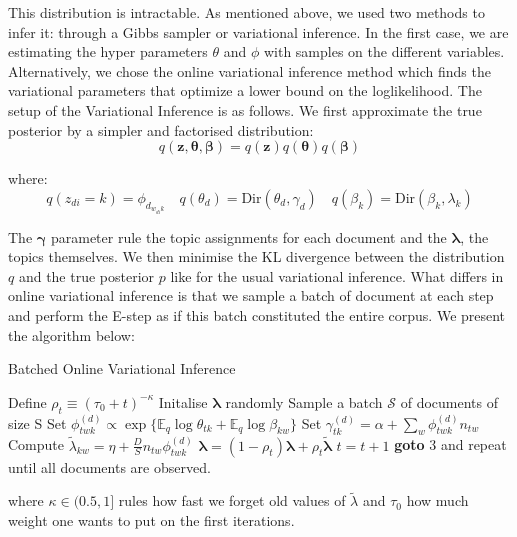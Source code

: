 \documentclass[twoside]{article}
\begin{document}
\begin{multicols}{2}
\noindent This distribution is intractable. As mentioned above, we used two  methods to infer it: through a Gibbs sampler or variational inference. In the first case, we are estimating the hyper parameters $\theta$ and $\phi$ with samples on the different variables. Alternatively, we chose the online variational inference method which finds the variational parameters that optimize a lower bound on the loglikelihood. The setup \cite{OLLD} of the Variational Inference is as follows. We first approximate the true posterior by a simpler and factorised distribution:
$$q(\boldsymbol{z},\boldsymbol{\theta},\boldsymbol{\beta}) = q(\boldsymbol{z})q(\boldsymbol{\theta})q(\boldsymbol{\beta}) $$ 

\noindent where:
$$ q(z_{di} = k) = \phi_{d_{w_{di}k}} \quad q(\theta_d) = \text{Dir}(\theta_d,\gamma_d) \quad q(\beta_k) = \text{Dir}(\beta_k,\lambda_k) $$

\noindent The $\boldsymbol{\gamma}$ parameter rule the topic assignments for each document and the $\boldsymbol{\lambda}$, the topics themselves. We then minimise the KL divergence between the distribution $q$ and the true posterior $p$ like for the usual variational inference. What differs in online variational inference is that we sample a batch of document at each step and perform the E-step as if this batch constituted the entire corpus. We present the algorithm below:

\begin{algorithm}[H]
\caption{Batched Online Variational Inference}\label{euclid}
\begin{algorithmic}[1]
\State Define $\rho_t \equiv (\tau_0 + t)^{-\kappa}$
\State Initalise $\boldsymbol{\lambda}$ randomly
\State Sample a batch $\mathcal{S}$ of documents of size S
\State Set $\phi^{(d)}_{twk} \propto \exp\{\mathbb{E}_q\log\theta_{tk} + \mathbb{E}_q\log\beta_{kw}\}$
\State Set $\gamma^{(d)}_{tk} = \alpha + \sum_{w} \phi^{(d)}_{twk}n_{tw}$
\EndWhile
\State Compute $\tilde{\lambda}_{kw} = \eta +\frac{D}{S}n_{tw}\phi^{(d)}_{twk}$
\EndFor
\State $\boldsymbol{\lambda} = (1-\rho_t)\boldsymbol{\lambda}+\rho_t\boldsymbol{\tilde{\lambda}}$
\State $t = t+1$
\State \textbf{goto} 3 and repeat until all documents are observed.
\end{algorithmic}
\end{algorithm}

\noindent where $\kappa \in (0.5,1]$ rules how fast we forget old values of $\tilde{\lambda}$ and $\tau_{0}$ how much weight one wants to put on the first iterations. 


\end{multicols}
\end{document}
